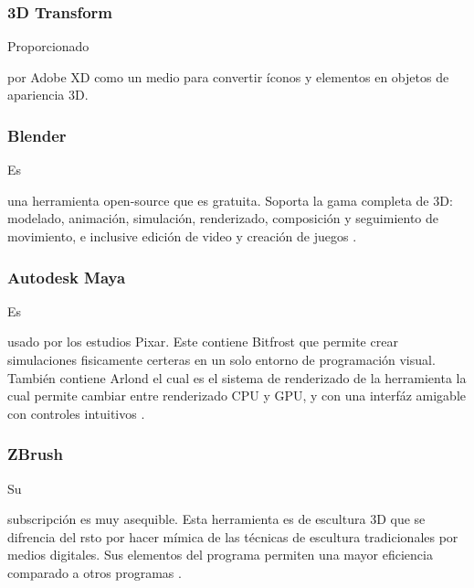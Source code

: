 \documentclass[stu, 12pt, letterpaper, donotrepeattitle, floatsintext, natbib]{apa7}
\begin{document}
    \subsubsection{3D Transform}
    Proporcionado \begin{justifying}
        por Adobe XD como un medio para convertir íconos y elementos en objetos de apariencia 3D.\par
    \end{justifying}
    \vspace{\baselineskip}
    \subsubsection{Blender}
    Es \begin{justifying}
        una herramienta open-source que es gratuita. Soporta la gama completa de 3D: modelado, animación, simulación, renderizado, composición y
        seguimiento de movimiento, e inclusive edición de video y creación de juegos \citep{unknown-author-no-date}. %
        \par
    \end{justifying}
    \vspace{\baselineskip}
    \subsubsection{Autodesk Maya}
    Es \begin{justifying}
        usado por los estudios Pixar. Este contiene Bitfrost que permite crear simulaciones fisicamente certeras en un solo entorno de programación visual. También
        contiene Arlond el cual es el sistema de renderizado de la herramienta la cual permite cambiar entre renderizado CPU y GPU, y con una interfáz
        amigable con controles intuitivos \citep{unknown-author-2021}. %
        \par
    \end{justifying}
    \vspace{\baselineskip}
    \subsubsection{ZBrush}
    Su \begin{justifying}
        subscripción es muy asequible. Esta herramienta es de escultura 3D que se difrencia del rsto por hacer mímica de las técnicas de escultura tradicionales por medios
        digitales. Sus elementos del programa permiten una mayor eficiencia comparado a otros programas \citep{petty-2018}. %
        \par
    \end{justifying}
    \vspace{\baselineskip}
\end{document}
